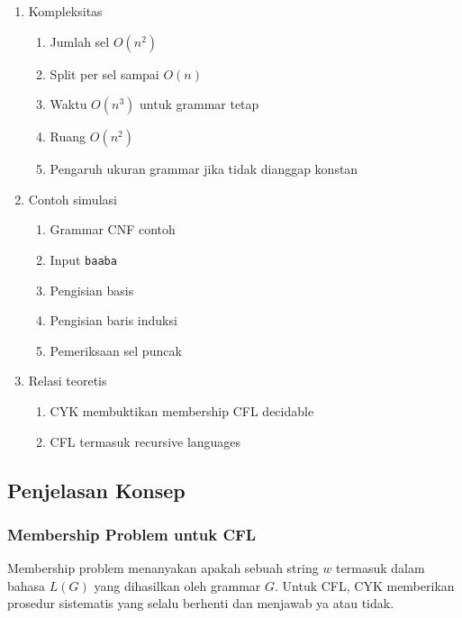 \begin{enumerate}
\begin{enumerate}
    \end{enumerate}
    \item \pwajib Kompleksitas
    \begin{enumerate}
        \item \pwajib Jumlah sel $O(n^2)$
        \item \pwajib Split per sel sampai $O(n)$
        \item \pwajib Waktu $O(n^3)$ untuk grammar tetap
        \item \ppaham Ruang $O(n^2)$
        \item \ppaham Pengaruh ukuran grammar jika tidak dianggap konstan
    \end{enumerate}
    \item \pwajib Contoh simulasi
    \begin{enumerate}
        \item \pwajib Grammar CNF contoh
        \item \pwajib Input \texttt{baaba}
        \item \pwajib Pengisian basis
        \item \pwajib Pengisian baris induksi
        \item \pwajib Pemeriksaan sel puncak
    \end{enumerate}
    \item \ppaham Relasi teoretis
    \begin{enumerate}
        \item \ppaham CYK membuktikan membership CFL decidable
        \item \ppaham CFL termasuk recursive languages
    \end{enumerate}
\end{enumerate}

\subsection{Penjelasan Konsep}

\subsubsection{\texorpdfstring{Membership Problem untuk CFL}{Membership Problem untuk CFL}}

\begin{jawab}
Membership problem menanyakan apakah sebuah string $w$ termasuk dalam bahasa $L(G)$ yang dihasilkan oleh grammar $G$. Untuk CFL, CYK memberikan prosedur sistematis yang selalu berhenti dan menjawab ya atau tidak.
\end{jawab}

